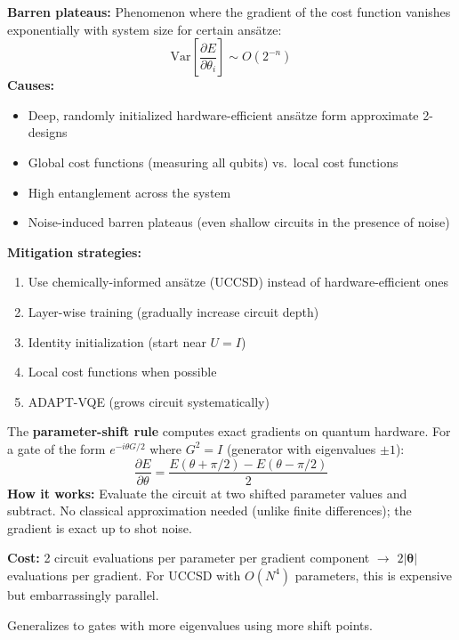 \documentclass[11pt,a4paper]{article}
\begin{document}
\begin{answerbox}
\textbf{Barren plateaus:} Phenomenon where the gradient of the cost function vanishes exponentially with system size for certain ansätze:
\[
\text{Var}\left[\frac{\partial E}{\partial \theta_i}\right] \sim O(2^{-n})
\]
\textbf{Causes:}
\begin{itemize}
    \item Deep, randomly initialized hardware-efficient ansätze form approximate 2-designs
    \item Global cost functions (measuring all qubits) vs.\ local cost functions
    \item High entanglement across the system
    \item Noise-induced barren plateaus (even shallow circuits in the presence of noise)
\end{itemize}
\textbf{Mitigation strategies:}
\begin{enumerate}
    \item Use chemically-informed ansätze (UCCSD) instead of hardware-efficient ones
    \item Layer-wise training (gradually increase circuit depth)
    \item Identity initialization (start near $U = I$)
    \item Local cost functions when possible
    \item ADAPT-VQE (grows circuit systematically)
\end{enumerate}
\end{answerbox}

\begin{answerbox}
The \textbf{parameter-shift rule} computes exact gradients on quantum hardware. For a gate of the form $e^{-i\theta G/2}$ where $G^2 = I$ (generator with eigenvalues $\pm 1$):
\[
\frac{\partial E}{\partial \theta} = \frac{E(\theta + \pi/2) - E(\theta - \pi/2)}{2}
\]
\textbf{How it works:} Evaluate the circuit at two shifted parameter values and subtract. No classical approximation needed (unlike finite differences); the gradient is exact up to shot noise.

\textbf{Cost:} 2 circuit evaluations per parameter per gradient component $\to$ $2|\boldsymbol{\theta}|$ evaluations per gradient. For UCCSD with $O(N^4)$ parameters, this is expensive but embarrassingly parallel.

Generalizes to gates with more eigenvalues using more shift points.
\end{answerbox}
\end{document}
